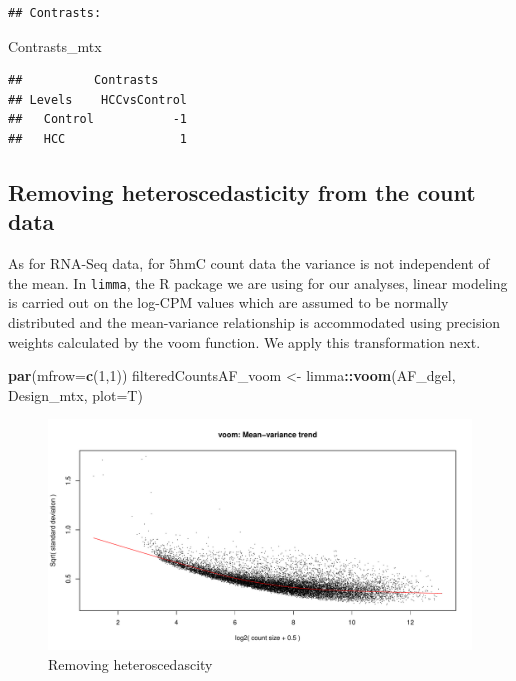 \documentclass[
]{book}
\newenvironment{Shaded}{\begin{snugshade}}{\end{snugshade}}
\newcommand{\DataTypeTok}[1]{\textcolor[rgb]{0.13,0.29,0.53}{#1}}
\newcommand{\DecValTok}[1]{\textcolor[rgb]{0.00,0.00,0.81}{#1}}
\newcommand{\KeywordTok}[1]{\textcolor[rgb]{0.13,0.29,0.53}{\textbf{#1}}}
\newcommand{\NormalTok}[1]{#1}
\newcommand{\OperatorTok}[1]{\textcolor[rgb]{0.81,0.36,0.00}{\textbf{#1}}}
\newcommand{\StringTok}[1]{\textcolor[rgb]{0.31,0.60,0.02}{#1}}
\begin{document}
\begin{verbatim}
## Contrasts:
\end{verbatim}

\begin{Shaded}
\begin{Highlighting}[]
\NormalTok{Contrasts\_mtx}
\end{Highlighting}
\end{Shaded}

\begin{verbatim}
##          Contrasts
## Levels    HCCvsControl
##   Control           -1
##   HCC                1
\end{verbatim}

\hypertarget{removing-heteroscedasticity-from-the-count-data}{%
\subsection*{Removing heteroscedasticity from the count data}\label{removing-heteroscedasticity-from-the-count-data}}

As for RNA-Seq data, for 5hmC count data the variance is not independent of the mean.
In \texttt{limma}, the R package we are using for our analyses,
linear modeling is carried out on the log-CPM values which are assumed to be
normally distributed and the mean-variance relationship is accommodated using precision
weights calculated by the voom function. We apply this transformation next.

\begin{Shaded}
\begin{Highlighting}[]
\KeywordTok{par}\NormalTok{(}\DataTypeTok{mfrow=}\KeywordTok{c}\NormalTok{(}\DecValTok{1}\NormalTok{,}\DecValTok{1}\NormalTok{))}
\NormalTok{filteredCountsAF\_voom <{-}}\StringTok{ }\NormalTok{limma}\OperatorTok{::}\KeywordTok{voom}\NormalTok{(AF\_dgel, Design\_mtx, }\DataTypeTok{plot=}\NormalTok{T)}
\end{Highlighting}
\end{Shaded}

\begin{figure}
\centering
\includegraphics{Static/figures/Voom1-1.pdf}
\caption{\label{fig:Voom1}Removing heteroscedascity}
\end{figure}
\end{document}
